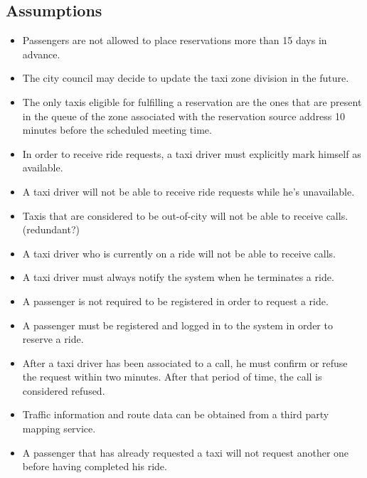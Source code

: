 \subsection{Assumptions}
\begin{itemize}
\item Passengers are not allowed to place reservations more than 15 days in advance. 
\item The city council may decide to update the taxi zone division in the future. 
\item The only taxis eligible for fulfilling a reservation are the ones that are present in the queue of the zone associated with the reservation source address 10 minutes before the scheduled meeting time.
\item In order to receive ride requests, a taxi driver must explicitly mark himself as available.
\item A taxi driver will not be able to receive ride requests while he’s unavailable.
\item Taxis that are considered to be out-of-city will not be able to receive calls. (redundant?)
\item A taxi driver who is currently on a ride will not be able to receive calls.
\item A taxi driver must always notify the system when he terminates a ride. 
\item A passenger is not required to be registered in order to request a ride.
\item A passenger must be registered and logged in to the system in order to reserve a ride.
\item After a taxi driver has been associated to a call, he must confirm or refuse the request within two minutes. After that period of time, the call is considered refused. 
\item Traffic information and route data can be obtained from a third party mapping service.
\item A passenger that has already requested a taxi will not request another one before having completed his ride.
\end{itemize}